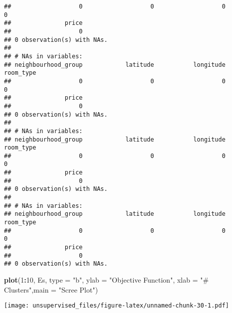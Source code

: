 \documentclass[
]{article}
\newenvironment{Shaded}{\begin{snugshade}}{\end{snugshade}}
\newcommand{\DataTypeTok}[1]{\textcolor[rgb]{0.13,0.29,0.53}{#1}}
\newcommand{\DecValTok}[1]{\textcolor[rgb]{0.00,0.00,0.81}{#1}}
\newcommand{\KeywordTok}[1]{\textcolor[rgb]{0.13,0.29,0.53}{\textbf{#1}}}
\newcommand{\NormalTok}[1]{#1}
\newcommand{\OperatorTok}[1]{\textcolor[rgb]{0.81,0.36,0.00}{\textbf{#1}}}
\newcommand{\StringTok}[1]{\textcolor[rgb]{0.31,0.60,0.02}{#1}}
\begin{document}
\begin{verbatim}
##                   0                   0                   0                   0 
##               price 
##                   0 
## 0 observation(s) with NAs.
## 
## # NAs in variables:
## neighbourhood_group            latitude           longitude           room_type 
##                   0                   0                   0                   0 
##               price 
##                   0 
## 0 observation(s) with NAs.
## 
## # NAs in variables:
## neighbourhood_group            latitude           longitude           room_type 
##                   0                   0                   0                   0 
##               price 
##                   0 
## 0 observation(s) with NAs.
## 
## # NAs in variables:
## neighbourhood_group            latitude           longitude           room_type 
##                   0                   0                   0                   0 
##               price 
##                   0 
## 0 observation(s) with NAs.
\end{verbatim}

\begin{Shaded}
\begin{Highlighting}[]
\KeywordTok{plot}\NormalTok{(}\DecValTok{1}\OperatorTok{:}\DecValTok{10}\NormalTok{, Es, }\DataTypeTok{type =} \StringTok{"b"}\NormalTok{, }\DataTypeTok{ylab =} \StringTok{"Objective Function"}\NormalTok{, }\DataTypeTok{xlab =} \StringTok{"# Clusters"}\NormalTok{,}\DataTypeTok{main =} \StringTok{"Scree Plot"}\NormalTok{) }
\end{Highlighting}
\end{Shaded}

\texttt{[image: unsupervised\_files/figure-latex/unnamed-chunk-30-1.pdf]}
\end{document}
